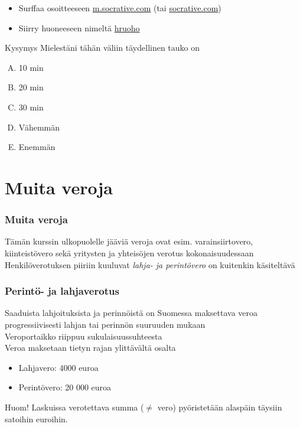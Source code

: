 \documentclass[]{beamer}\usepackage[]{graphicx}\usepackage[]{color}
\newcommand{\pblock}{\\ \vspace{0.5cm}\pause}
\newcommand{\socrativeOhje}{
\begin{itemize}
\item Surffaa osoitteeseen \url{m.socrative.com} (tai \url{socrative.com})
\item Siirry huoneeseen nimeltä \url{hruoho}
\end{itemize}
}
\newcommand{\taukoKysymys}{
\socrativeOhje
	\begin{block}{Kysymys}
	Mielestäni tähän väliin täydellinen tauko on
	\begin{enumerate}[(A)]
		\item 10 min
		\item 20 min
		\item 30 min
		\item Vähemmän 
		\item Enemmän
	\end{enumerate}	
	\end{block}
}
\begin{document}
\begin{frame}
\taukoKysymys
\end{frame}

\section{Muita veroja}

\begin{frame}
\frametitle{Muita veroja}
\pause
Tämän kurssin ulkopuolelle jääviä veroja ovat esim. varainsiirtovero,  kiinteistövero sekä yritysten ja yhteisöjen verotus kokonaisuudessaan
\pblock
Henkilöverotuksen piiriin kuuluvat \emph{lahja- ja perintövero} on kuitenkin käsiteltävä


\end{frame}

\begin{frame}
	\frametitle{Perintö- ja lahjaverotus}
	\pause
	Saaduista lahjoituksista ja perinnöistä on Suomessa maksettava veroa progressiivisesti lahjan tai perinnön suuruuden mukaan
	\pblock
	Veroportaikko riippuu sukulaisuussuhteesta
	\pblock
	Veroa maksetaan tietyn rajan ylittävältä osalta
	\begin{itemize}
		\item Lahjavero: 4000 euroa
		\item Perintövero: 20 000 euroa
	\pblock
	\end{itemize}
	
	Huom! Laskuissa verotettava summa (\(\neq\) vero) pyöristetään alaspäin täysiin satoihin euroihin.
\end{frame}
\end{document}
